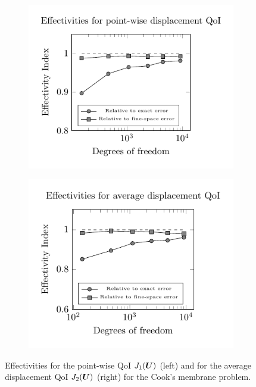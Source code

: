 \begin{figure}[ht!]
\centering
\begin{subfigure}{.5\textwidth}
\centering
\includegraphics[width=.99\linewidth]{img/mech_cooks_pw_effectivity_plot.pdf}
\end{subfigure}%
\begin{subfigure}{.5\textwidth}
\centering
\includegraphics[width=.95\linewidth]{img/mech_cooks_avg_disp_effectivity_plot.pdf}
\end{subfigure}
\caption{Effectivities for the point-wise QoI $J_1(\boldsymbol{U})$ (left) and for the
average displacement QoI $J_2(\boldsymbol{U})$ (right) for the Cook's membrane
problem.}
\label{fig:mech_cooks_effectivity}
\end{figure}

